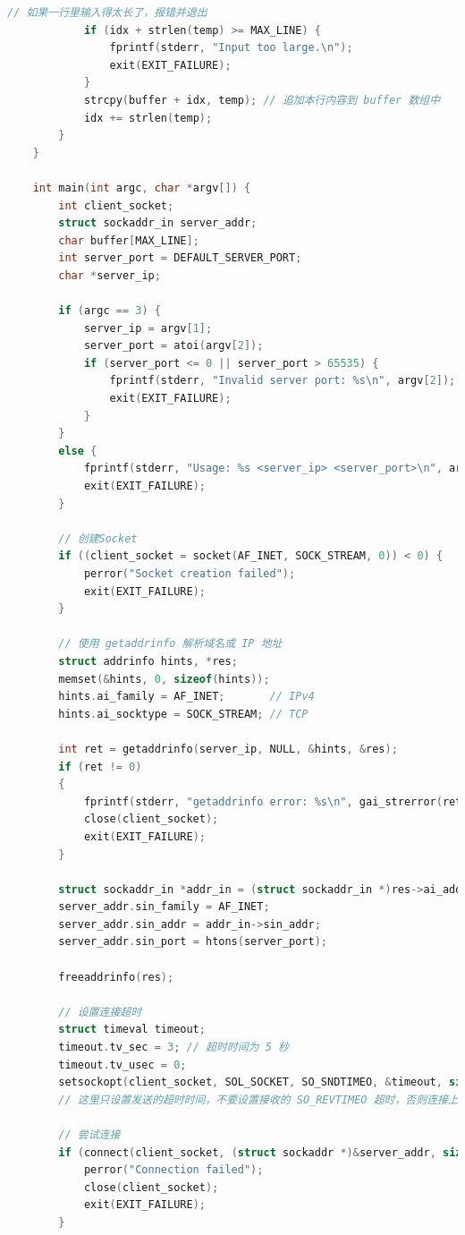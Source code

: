 \documentclass[14pt,a4paper,UTF8,twoside]{article}
\begin{document}
\begin{lstlisting}[language=C]
            // 如果一行里输入得太长了，报错并退出
            if (idx + strlen(temp) >= MAX_LINE) {
                fprintf(stderr, "Input too large.\n");
                exit(EXIT_FAILURE);
            }
            strcpy(buffer + idx, temp); // 追加本行内容到 buffer 数组中
            idx += strlen(temp);
        }
    }
    
    int main(int argc, char *argv[]) {
        int client_socket;
        struct sockaddr_in server_addr;
        char buffer[MAX_LINE];
        int server_port = DEFAULT_SERVER_PORT;
        char *server_ip;
    
        if (argc == 3) {
            server_ip = argv[1];
            server_port = atoi(argv[2]);
            if (server_port <= 0 || server_port > 65535) {
                fprintf(stderr, "Invalid server port: %s\n", argv[2]);
                exit(EXIT_FAILURE);
            }
        }
        else {
            fprintf(stderr, "Usage: %s <server_ip> <server_port>\n", argv[0]);
            exit(EXIT_FAILURE);
        }
    
        // 创建Socket
        if ((client_socket = socket(AF_INET, SOCK_STREAM, 0)) < 0) {
            perror("Socket creation failed");
            exit(EXIT_FAILURE);
        }
    
        // 使用 getaddrinfo 解析域名或 IP 地址
        struct addrinfo hints, *res;
        memset(&hints, 0, sizeof(hints));
        hints.ai_family = AF_INET;       // IPv4
        hints.ai_socktype = SOCK_STREAM; // TCP
    
        int ret = getaddrinfo(server_ip, NULL, &hints, &res);
        if (ret != 0)
        {
            fprintf(stderr, "getaddrinfo error: %s\n", gai_strerror(ret));
            close(client_socket);
            exit(EXIT_FAILURE);
        }
    
        struct sockaddr_in *addr_in = (struct sockaddr_in *)res->ai_addr;
        server_addr.sin_family = AF_INET;
        server_addr.sin_addr = addr_in->sin_addr;
        server_addr.sin_port = htons(server_port);
    
        freeaddrinfo(res);
    
        // 设置连接超时
        struct timeval timeout;
        timeout.tv_sec = 3; // 超时时间为 5 秒
        timeout.tv_usec = 0;
        setsockopt(client_socket, SOL_SOCKET, SO_SNDTIMEO, &timeout, sizeof(timeout));
        // 这里只设置发送的超时时间，不要设置接收的 SO_REVTIMEO 超时，否则连接上了也会断开
    
        // 尝试连接
        if (connect(client_socket, (struct sockaddr *)&server_addr, sizeof(server_addr)) < 0) {
            perror("Connection failed");
            close(client_socket);
            exit(EXIT_FAILURE);
        }
    

\end{lstlisting}
\end{document}
